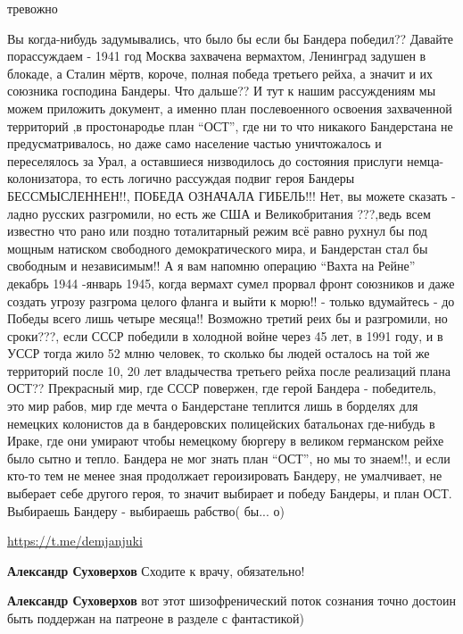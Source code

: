 \begin{itemize}
тревожно


Вы когда-нибудь задумывались, что было бы если бы Бандера победил?? Давайте
порассуждаем - 1941 год Москва захвачена вермахтом, Ленинград задушен в
блокаде, а Сталин мёртв, короче, полная победа третьего рейха, а значит и их
союзника господина Бандеры. Что дальше?? И тут к нашим рассуждениям мы можем
приложить документ, а именно план послевоенного освоения захваченной территорий
,в простонародье план \enquote{ОСТ}, где ни то что никакого Бандерстана не
предусматривалось, но даже само население частью уничтожалось и переселялось за
Урал, а оставшиеся низводилось до состояния прислуги немца-колонизатора, то есть
логично рассуждая подвиг героя Бандеры БЕССМЫСЛЕННЕН!!, ПОБЕДА ОЗНАЧАЛА
ГИБЕЛЬ!!! Нет, вы можете сказать - ладно русских разгромили, но есть же США и
Великобритания ???,ведь всем известно что рано или поздно тоталитарный режим
всё равно рухнул бы под мощным натиском свободного демократического мира, и
Бандерстан стал бы свободным и независимым!! А я вам напомню операцию \enquote{Вахта на
Рейне} декабрь 1944 -январь 1945, когда вермахт сумел прорвал фронт союзников и
даже создать угрозу разгрома целого фланга и выйти к морю!! - только вдумайтесь
- до Победы всего лишь четыре месяца!! Возможно третий реих бы и разгромили, но
сроки???, если СССР победили в холодной войне через 45 лет, в 1991 году, и в УССР
тогда жило 52 млню человек, то сколько бы людей осталось на той же территорий
после 10, 20 лет владычества третьего рейха после реализаций плана ОСТ??
Прекрасный мир, где СССР повержен, где герой Бандера - победитель, это мир
рабов, мир где мечта о Бандерстане теплится лишь в борделях для немецких
колонистов да в бандеровских полицейских батальонах где-нибудь в Ираке, где они
умирают чтобы немецкому бюргеру в великом германском рейхе было сытно и
тепло. Бандера не мог знать план \enquote{ОСТ}, но мы то знаем!!, и если кто-то тем не
менее зная продолжает героизировать Бандеру, не умалчивает, не выберает себе
другого героя, то значит выбирает и победу Бандеры, и план ОСТ. Выбираешь Бандеру
- выбираешь рабство( бы... о) 

\url{https://t.me/demjanjuki}

\begin{itemize} %
\textbf{Александр Суховерхов} Сходите к врачу, обязательно!

\textbf{Александр Суховерхов} вот этот шизофренический поток сознания точно достоин быть поддержан на патреоне в разделе с фантастикой)
\end{itemize} %


\end{itemize}
